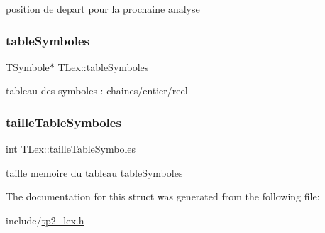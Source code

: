 position de depart pour la prochaine analyse \mbox{\label{structTLex_a31a6c4fc0839643e3251a372ba7adf04}} 
\subsubsection{\texorpdfstring{table\+Symboles}{tableSymboles}}
{\footnotesize\ttfamily \hyperlink{structTSymbole}{T\+Symbole}$\ast$ T\+Lex\+::table\+Symboles}

tableau des symboles \+: chaines/entier/reel \mbox{\label{structTLex_abb50eca8f47fc2c73983a5909967e362}} 
\subsubsection{\texorpdfstring{taille\+Table\+Symboles}{tailleTableSymboles}}
{\footnotesize\ttfamily int T\+Lex\+::taille\+Table\+Symboles}

taille memoire du tableau table\+Symboles 

The documentation for this struct was generated from the following file\+:\begin{DoxyCompactItemize}
\item 
include/\hyperlink{tp2__lex_8h}{tp2\+\_\+lex.\+h}\end{DoxyCompactItemize}
